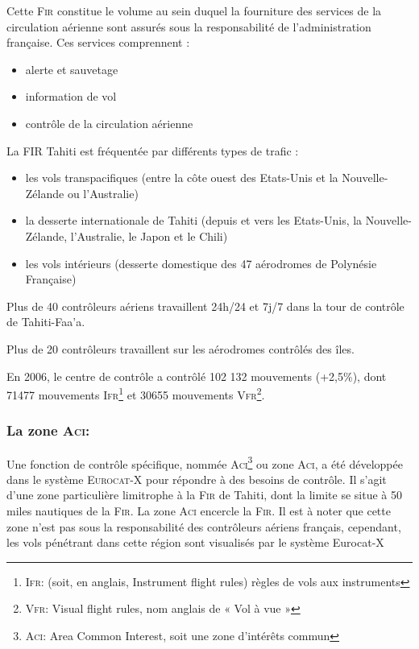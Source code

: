 Cette \textsc{Fir} constitue le volume au sein duquel la fourniture des services de la circulation aérienne sont assurés sous la responsabilité de l'administration française. Ces services comprennent :
\begin{itemize}
    \item alerte et sauvetage
    \item information de vol
    \item contrôle de la circulation aérienne
\end{itemize}\medskip
La FIR Tahiti est fréquentée par différents types de trafic :
\begin{itemize}
    \item les vols transpacifiques (entre la côte ouest des Etats-Unis et la Nouvelle-Zélande ou l'Australie)
    \item la desserte internationale de Tahiti (depuis et vers les Etats-Unis, la Nouvelle-Zélande, l'Australie, le Japon et le Chili)
    \item les vols intérieurs (desserte domestique des 47 aérodromes de Polynésie Française)
\end{itemize}\medskip

Plus de 40 contrôleurs aériens travaillent 24h/24 et 7j/7 dans la tour de contrôle de Tahiti-Faa'a.

Plus de 20 contrôleurs travaillent sur les aérodromes contrôlés des îles.

En 2006, le centre de contrôle a contrôlé 102 132 mouvements (+2,5\%), dont 71477 mouvements \textsc{Ifr}\footnote{\textsc{Ifr}: (soit, en anglais, Instrument flight rules) règles de vols aux instruments} et 30655 mouvements \textsc{Vfr}\footnote{\textsc{Vfr}: Visual flight rules, nom anglais de « Vol à vue »}.

        \subsubsection{La zone \textsc{Aci}:\label{Aci}}
Une fonction de contrôle spécifique, nommée \textsc{Aci}\footnote{\textsc{Aci}: Area Common Interest, soit une zone d'intérêts commun} ou zone \textsc{Aci}, a été développée dans le système \textsc{Eurocat-X} pour répondre à des besoins de contrôle. Il s’agit d’une zone particulière limitrophe à la \textsc{Fir}  de Tahiti, dont la limite se situe à 50 miles nautiques de la \textsc{Fir}. La zone \textsc{Aci} encercle la \textsc{Fir}. Il est à noter que cette zone n’est pas sous la responsabilité des contrôleurs aériens français, cependant, les vols pénétrant dans cette région sont visualisés par le système Eurocat-X 

